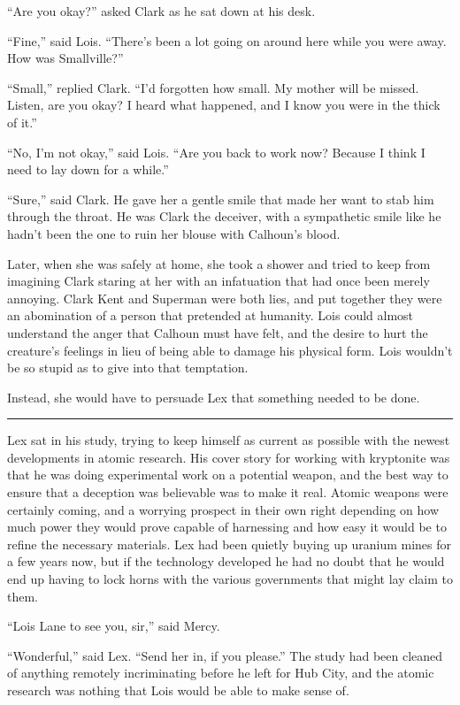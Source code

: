 \documentclass[ebook,12pt]{memoir}
\begin{document}
``Are you okay?'' asked Clark as he sat down at his desk.

``Fine,'' said Lois. ``There's been a lot going on around here while you
were away. How was Smallville?''

``Small,'' replied Clark. ``I'd forgotten how small. My mother will be
missed. Listen, are you okay? I heard what happened, and I know you were
in the thick of it.''

``No, I'm not okay,'' said Lois. ``Are you back to work now? Because I
think I need to lay down for a while.''

``Sure,'' said Clark. He gave her a gentle smile that made her want to
stab him through the throat. He was Clark the deceiver, with a
sympathetic smile like he hadn't been the one to ruin her blouse with
Calhoun's blood.

Later, when she was safely at home, she took a shower and tried to keep
from imagining Clark staring at her with an infatuation that had once
been merely annoying. Clark Kent and Superman were both lies, and put
together they were an abomination of a person that pretended at
humanity. Lois could almost understand the anger that Calhoun must have
felt, and the desire to hurt the creature's feelings in lieu of being
able to damage his physical form. Lois wouldn't be so stupid as to give
into that temptation.

Instead, she would have to persuade Lex that something needed to be
done.

\begin{center}\rule{0.5\linewidth}{0.5pt}\end{center}

Lex sat in his study, trying to keep himself as current as possible with
the newest developments in atomic research. His cover story for working
with kryptonite was that he was doing experimental work on a potential
weapon, and the best way to ensure that a deception was believable was
to make it real. Atomic weapons were certainly coming, and a worrying
prospect in their own right depending on how much power they would prove
capable of harnessing and how easy it would be to refine the necessary
materials. Lex had been quietly buying up uranium mines for a few years
now, but if the technology developed he had no doubt that he would end
up having to lock horns with the various governments that might lay
claim to them.

``Lois Lane to see you, sir,'' said Mercy.

``Wonderful,'' said Lex. ``Send her in, if you please.'' The study had
been cleaned of anything remotely incriminating before he left for Hub
City, and the atomic research was nothing that Lois would be able to
make sense of.
\end{document}
